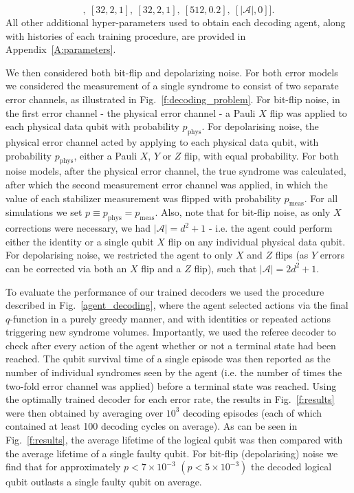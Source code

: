 \documentclass[twocolumn,preprintnumbers,amsmath,amssymb,notitlepage,nofootinbib,longbibliography,superscriptaddress,aps,pra,10pt]{revtex4-1}
\begin{document}
	\begin{equation}
		[[64,3,2],~[32,2,1],~[32,2,1],~[512,0.2],~[|\mathcal{A}|, 0]].
	\end{equation}
	All other additional hyper-parameters used to obtain each decoding agent, along with histories of each training procedure, are provided in Appendix~\ref{A:parameters}.

	We then considered both bit-flip and depolarizing noise.
	For both error models we considered the measurement of a single syndrome to consist of two separate error channels, as illustrated in Fig.~\ref{f:decoding_problem}.
	For bit-flip noise, in the first error channel - the physical error channel - a Pauli $X$ flip was applied to each physical data qubit with probability $p_{\mathrm{phys}}$.
	For depolarising noise, the physical error channel acted by applying to each physical data qubit, with probability $p_{\mathrm{phys}}$, either a Pauli $X$, $Y$ or $Z$ flip, with equal probability.
	For both noise models, after the physical error channel, the true syndrome was calculated, after which the second measurement error channel was applied, in which the value of each stabilizer measurement was flipped with probability $p_{\mathrm{meas}}$.
	For all simulations we set $p \equiv p_{\mathrm{phys}} = p_{\mathrm{meas}}$.
	Also, note that for bit-flip noise, as only $X$ corrections were necessary, we had $|\mathcal{A}| = d^2 + 1$ - i.e. the agent could perform either the identity or a single qubit $X$ flip on any individual physical data qubit.
	For depolarising noise, we restricted the agent to only $X$ and $Z$ flips (as $Y$ errors can be corrected via both an $X$ flip and a $Z$ flip), such that $|\mathcal{A}| = 2d^2 + 1$.

	To evaluate the performance of our trained decoders we used the procedure described in Fig.~\ref{agent_decoding}, where the agent selected actions via the final $q$-function in a purely greedy manner, and with identities or repeated actions triggering new syndrome volumes.
	Importantly, we used the referee decoder to check after every action of the agent whether or not a terminal state had been reached.
	The qubit survival time of a single episode was then reported as the number of individual syndromes seen by the agent (i.e. the number of times the two-fold error channel was applied) before a terminal state was reached.
	Using the optimally trained decoder for each error rate, the results in Fig.~\ref{f:results} were then obtained by averaging over $10^3$ decoding episodes (each of which contained at least 100 decoding cycles on average).
	As can be seen in Fig.~\ref{f:results}, the average lifetime of the logical qubit was then compared with the average lifetime of a single faulty qubit.
	For bit-flip (depolarising) noise we find that for approximately $p < 7\times 10^{-3}$  $(p < 5\times 10^{-3})$ the decoded logical qubit outlasts a single faulty qubit on average.
\end{document}

